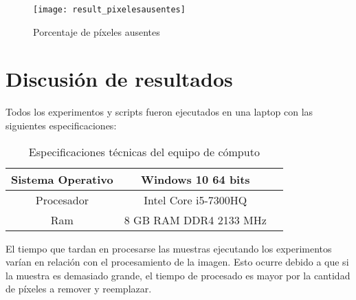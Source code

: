 \begin{figure}[h!]
  \centering  
  \begin{minipage}[b]{0.65\textwidth}
        \texttt{[image: result\_pixelesausentes]}
    \caption{Porcentaje de píxeles ausentes} 
    \label{Porcentaje de píxeles ausentes}
  \end{minipage}
\end{figure}

\newpage
\section{Discusión de resultados}
Todos los experimentos y scripts fueron ejecutados en una laptop con las siguientes especificaciones:

\begin{table}[H]
	{\centering
		\caption{Especificaciones técnicas del equipo de cómputo}
		\begin{tabular}{|c|c|c|}
			\hline
			Sistema Operativo & Windows 10 64 bits\\
			\hline
			Procesador & Intel Core i5-7300HQ\\
			\hline
			Ram & 8 GB RAM DDR4 2133 MHz\\
			\hline
		\end{tabular}

	\label{tab:Especificaciones técnicas del PC}
	}
\end{table}


El tiempo que tardan en procesarse las muestras ejecutando los experimentos varían en relación con el procesamiento de la imagen. Esto ocurre debido a que si la muestra es demasiado grande, el tiempo de procesado es mayor por la cantidad de píxeles a remover y reemplazar. 


